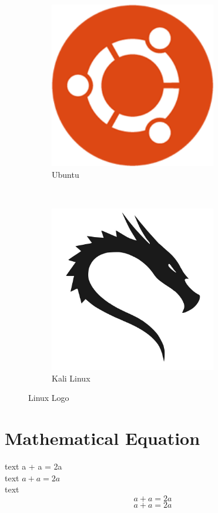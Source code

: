 \documentclass[14pt]{article}
\begin{document}
	\begin{figure}[h]
		\centering
		\begin{subfigure}{0.4\textwidth}
			\includegraphics[width=0.8\textwidth]{ubuntulogo.png}
			\caption{Ubuntu}
		\end{subfigure}
	~
		\begin{subfigure}{0.4\textwidth}
			\includegraphics[width=0.8\textwidth]{kalilinuxlogo.jpeg}
			\caption{Kali Linux}
		\end{subfigure}
		\caption{Linux Logo}
	\end{figure}

	\section{Mathematical Equation}
	text a + a = 2a\\
	text $a + a = 2a$\\
	text $$a + a = 2a$$
	\begin{equation}
	a + a = 2a
	\end{equation}
	
\end{document}
